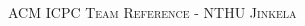 \documentclass[a4paper,10pt,oneside]{article}
\begin{document}
  \begin{multicols}{4}
  \pagestyle{fancy}
  
  \fancyfoot{}
  \fancyhead[R]{\thepage}
  
  \renewcommand{\headrulewidth}{0.4pt}
  \renewcommand{\contentsname}{Contents}

   
  \scriptsize
  
  \clearpage
  \end{multicols}
  \newpage
  \begin{multicols}{4}
  \enlargethispage*{\baselineskip}
  \begin{center}
    \Huge\textsc{ACM ICPC Team Reference - NTHU Jinkela}
    \vspace{0.35cm}    
  \end{center}
  \tableofcontents
  \end{multicols}
  \clearpage
\end{document}
